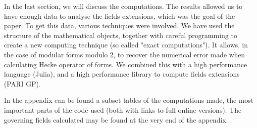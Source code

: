 In the last section, we will discuss the computations.
The results allowed us to have enough data to analyse the fields extensions, which was the goal of the paper.
To get this data, various techniques were involved.
We have used the structure of the mathematical objects, together with careful programming to create a new computing technique (so called "exact computations").
It allows, in the case of modular forms modulo 2, to recover the numerical error made when calculating Hecke operator of forms.
We combined this with a high performance language (Julia), and a high performance library to compute fields extensions (PARI GP).

In the appendix can be found a subset tables of the computations made, the most important parts of the code used (both with links to full online versions).
The governing fields calculated may be found at the very end of the appendix.
